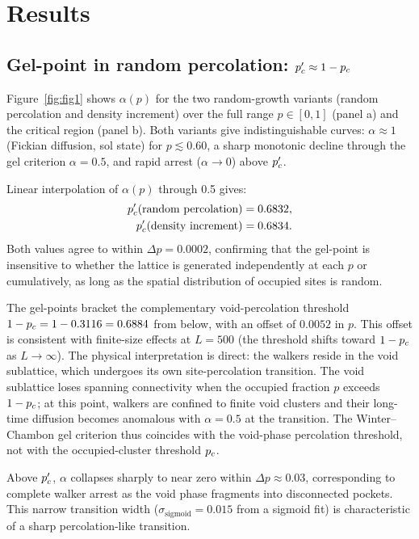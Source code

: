 \section{Results}
\label{sec:results}

\subsection{Gel-point in random percolation: $p_c' \approx 1 - p_c$}
\label{sec:results_base}

Figure~\ref{fig:fig1} shows $\alpha(p)$ for the two random-growth variants (random percolation and density increment) over the full range $p \in [0, 1]$ (panel a) and the critical region (panel b). Both variants give indistinguishable curves: $\alpha \approx 1$ (Fickian diffusion, sol state) for $p \lesssim 0.60$, a sharp monotonic decline through the gel criterion $\alpha = 0.5$, and rapid arrest ($\alpha \to 0$) above $p_c'$.

Linear interpolation of $\alpha(p)$ through 0.5 gives:
\begin{align}
  p_c'(\text{random percolation}) &= 0.6832, \nonumber \\
  p_c'(\text{density increment})  &= 0.6834.
  \label{eq:pc_random}
\end{align}
Both values agree to within $\Delta p = 0.0002$, confirming that the gel-point is insensitive to whether the lattice is generated independently at each $p$ or cumulatively, as long as the spatial distribution of occupied sites is random.

The gel-points bracket the complementary void-percolation threshold $1 - p_c = 1 - 0.3116 = 0.6884$ from below, with an offset of $0.0052$ in $p$. This offset is consistent with finite-size effects at $L = 500$ (the threshold shifts toward $1 - p_c$ as $L \to \infty$). The physical interpretation is direct: the walkers reside in the void sublattice, which undergoes its own site-percolation transition. The void sublattice loses spanning connectivity when the occupied fraction $p$ exceeds $1 - p_c$; at this point, walkers are confined to finite void clusters and their long-time diffusion becomes anomalous with $\alpha = 0.5$ at the transition. The Winter--Chambon gel criterion thus coincides with the void-phase percolation threshold, not with the occupied-cluster threshold $p_c$.

Above $p_c'$, $\alpha$ collapses sharply to near zero within $\Delta p \approx 0.03$, corresponding to complete walker arrest as the void phase fragments into disconnected pockets. This narrow transition width ($\sigma_\mathrm{sigmoid} = 0.015$ from a sigmoid fit) is characteristic of a sharp percolation-like transition.

